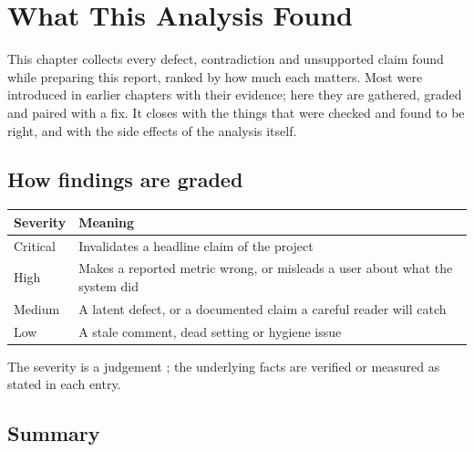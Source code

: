 \chapter{What This Analysis Found}
\label{ch:findings}

This chapter collects every defect, contradiction and unsupported claim found while preparing this report, ranked by how much each matters. Most were introduced in earlier chapters with their evidence; here they are gathered, graded and paired with a fix. It closes with the things that were checked and found to be right, and with the side effects of the analysis itself.

\section{How findings are graded}

\begin{center}
\begin{tabularx}{\textwidth}{@{}>{\raggedright\arraybackslash}p{2.2cm}L@{}}
\toprule
\textbf{Severity} & \textbf{Meaning}\\
\midrule
Critical & Invalidates a headline claim of the project\\
High & Makes a reported metric wrong, or misleads a user about what the system did\\
Medium & A latent defect, or a documented claim a careful reader will catch\\
Low & A stale comment, dead setting or hygiene issue\\
\bottomrule
\end{tabularx}
\end{center}

The severity is a judgement \tagI; the underlying facts are verified or measured as stated in each entry.

\section{Summary}

